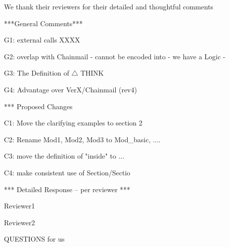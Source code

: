 We thank their reviewers for their detailed and thoughtful comments 


***General Comments***

G1: external calls
XXXX

G2:  overlap with Chainmail
- cannot be encoded into
- we have a Logic
- %

G3: The Definition of $\triangle$
THINK

G4: Advantage over VerX/Chainmail (rev4)


*** Proposed Changes

C1: Move the clarifying examples to section 2

C2: Rename Mod1, Mod2, Mod3 to Mod_{basic}, ....

C3: move the definition of "inside" to ...

C4: make consistent use of Section/Sectio

 


*** Detailed Response -- per reviewer ***

Reviewer1

Reviewer2


QUESTIONS for us